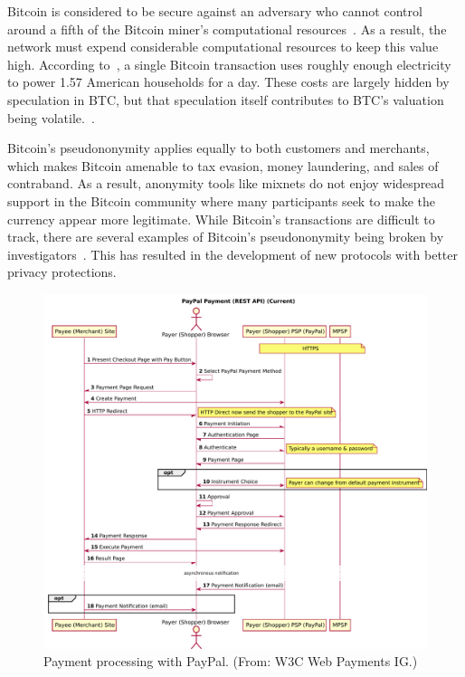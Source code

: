 \documentclass{llncs}
\begin{document}
Bitcoin is considered to be secure against an adversary who cannot
control around a fifth of the Bitcoin miner's computational
resources~\cite{BTC:Bahack13,BTC:MajorityNotEnough,BTC:Eclipse}.  %
As a result, the network must expend considerable computational
resources to keep this value high.
According to~\cite{vice_btc_unsustainable}, a single Bitcoin transaction uses roughly enough
electricity to power 1.57 American households for a day.
These costs are largely hidden by speculation in BTC,
but that speculation itself contributes to BTC's valuation being
volatile.~\cite{jeffries_economists_v_btc,lehmann_btc_fools_gold,lewis_btc_is_junk}. %


Bitcoin's pseudononymity applies equally to both customers and
merchants, which makes Bitcoin amen\-able to tax evasion, money
laundering, and sales of contraband.  As a result, anonymity tools
like mixnets do not enjoy widespread support in the
Bitcoin community where many participants seek to make the currency
appear more legitimate.  While Bitcoin's transactions are difficult to
track, there are several examples of Bitcoin's pseudononymity being
broken by investigators~\cite{BTC:Anonymity}.  This has resulted in
the development of new protocols with better privacy protections.

\begin{figure}[t!]
\includegraphics[width=\textwidth]{figs/paypal.pdf}
\caption{Payment processing with PayPal. (From: W3C Web Payments IG.)}
\label{fig:paypal}
\end{figure}
\end{document}
